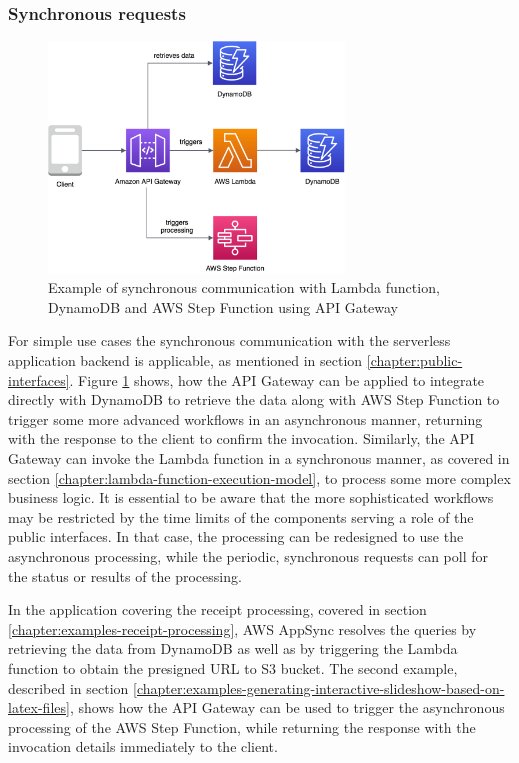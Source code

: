 \subsubsection{Synchronous requests} \label{chapter:client-synchronous-requests}

\begin{figure}[]
   \centering
   \includegraphics[width=0.7\textwidth]{assets/04-serverless-for-web-apps/synchronousRequest.png}
   \caption{Example of synchronous communication with Lambda function, DynamoDB and AWS Step Function using API Gateway}
   \label{fig:pattern-synchronous-request}
\end{figure}

For simple use cases the synchronous communication with the serverless application backend is applicable, as mentioned in section \ref{chapter:public-interfaces}.
Figure \ref{fig:pattern-synchronous-request} shows, how the API Gateway can be applied to integrate directly with DynamoDB to retrieve the data along with AWS Step Function to trigger some more advanced workflows in an asynchronous manner, returning with the response to the client to confirm the invocation.
Similarly, the API Gateway can invoke the Lambda function in a synchronous manner, as covered in section \ref{chapter:lambda-function-execution-model}, to process some more complex business logic.
It is essential to be aware that the more sophisticated workflows may be restricted by the time limits of the components serving a role of the public interfaces.
In that case, the processing can be redesigned to use the asynchronous processing, while the periodic, synchronous requests can poll for the status or results of the processing.

In the application covering the receipt processing, covered in section \ref{chapter:examples-receipt-processing}, AWS AppSync resolves the queries by retrieving the data from DynamoDB as well as by triggering the Lambda function to obtain the presigned URL to S3 bucket.
The second example, described in section \ref{chapter:examples-generating-interactive-slideshow-based-on-latex-files}, shows how the API Gateway can be used to trigger the asynchronous processing of the AWS Step Function, while returning the response with the invocation details immediately to the client.

